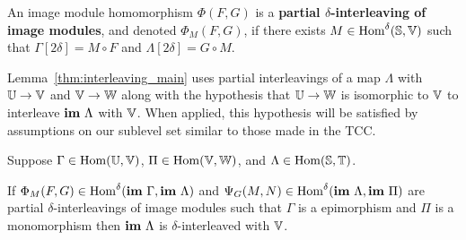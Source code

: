 \begin{definition}
  An image module homomorphism $\Phi(F, G)$ is a \textbf{partial $\delta$-interleaving of image modules}, and denoted $\Phi_M(F, G)$, if there exists $M\in\mathrm{Hom}^\delta(\mathbb{S},\mathbb{V})$ such that $\Gamma[2\delta] = M\circ F$ and $\Lambda[2\delta] = G\circ M$.
\end{definition}



Lemma~\ref{thm:interleaving_main} uses partial interleavings of a map $\Lambda$ with $\mathbb{U}\to\mathbb{V}$ and $\mathbb{V}\to\mathbb{W}$ along with the hypothesis that $\mathbb{U}\to \mathbb{W}$ is isomorphic to $\mathbb{V}$ to interleave $\mathbf{im}~\Lambda$ with $\mathbb{V}$.
When applied, this hypothesis will be satisfied by assumptions on our sublevel set similar to those made in the TCC.

\begin{lemma}\label{thm:interleaving_main}
  Suppose $\Gamma\in\mathrm{Hom}(\mathbb{U},\mathbb{V})$, $\Pi\in\mathrm{Hom}(\mathbb{V},\mathbb{W})$, and $\Lambda\in\mathrm{Hom}(\mathbb{S}, \mathbb{T})$.

  If $\Phi_M(F, G)\in\mathrm{Hom}^\delta(\mathbf{im}~\Gamma, \mathbf{im}~\Lambda)$ and $\Psi_G(M, N)\in\mathrm{Hom}^\delta(\mathbf{im}~\Lambda, \mathbf{im}~\Pi)$ are partial $\delta$-interleavings of image modules such that $\Gamma$ is a epimorphism and $\Pi$ is a monomorphism then $\mathbf{im}~\Lambda$ is $\delta$-interleaved with $\mathbb{V}$.
\end{lemma}
